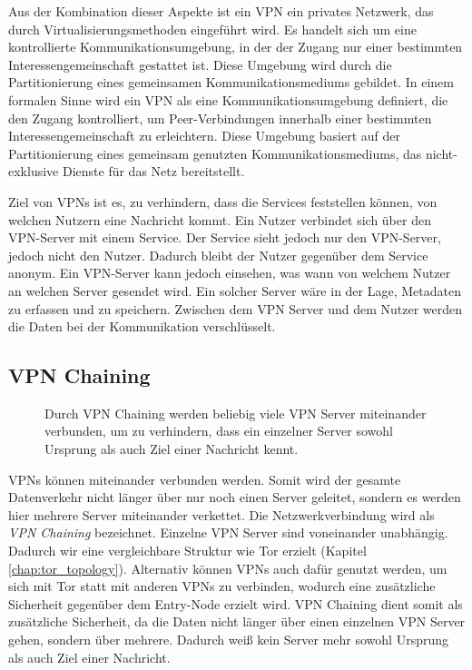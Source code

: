Aus der Kombination dieser Aspekte ist ein VPN ein privates Netzwerk, das durch Virtualisierungsmethoden eingeführt wird. Es handelt sich um eine kontrollierte Kommunikationsumgebung, in der der Zugang nur einer bestimmten Interessengemeinschaft gestattet ist. Diese Umgebung wird durch die Partitionierung eines gemeinsamen Kommunikationsmediums gebildet.
In einem formalen Sinne wird ein VPN als eine Kommunikationsumgebung definiert, die den Zugang kontrolliert, um Peer-Verbindungen innerhalb einer bestimmten Interessengemeinschaft zu erleichtern. Diese Umgebung basiert auf der Partitionierung eines gemeinsam genutzten Kommunikationsmediums, das nicht-exklusive Dienste für das Netz bereitstellt\cite{DefinitionOfVPN}.

Ziel von VPNs ist es, zu verhindern, dass die Services feststellen können, von welchen Nutzern eine Nachricht kommt. Ein Nutzer verbindet sich über den VPN-Server mit einem Service. Der Service sieht jedoch nur den VPN-Server, jedoch nicht den Nutzer. Dadurch bleibt der Nutzer gegenüber dem Service anonym.
Ein VPN-Server kann jedoch einsehen, was wann von welchem Nutzer an welchen Server gesendet wird. Ein solcher Server wäre in der Lage, Metadaten zu erfassen und zu speichern. Zwischen dem VPN Server und dem Nutzer werden die Daten bei der Kommunikation verschlüsselt.

\subsection{VPN Chaining}
\label{chap:vpn_chaining}

\begin{figure}[!h]
    \centering
    
    \caption{Durch VPN Chaining werden beliebig viele VPN Server miteinander verbunden, um zu verhindern, dass ein einzelner Server sowohl Ursprung als auch Ziel einer Nachricht kennt.}
    \label{imgs:vpn_chaining}
\end{figure}

VPNs können miteinander verbunden werden. Somit wird der gesamte Datenverkehr nicht länger über nur noch einen Server geleitet, sondern es werden hier mehrere Server miteinander verkettet. Die Netzwerkverbindung wird als \textit{VPN Chaining} bezeichnet. Einzelne VPN Server sind voneinander unabhängig. Dadurch wir eine vergleichbare Struktur wie Tor erzielt (Kapitel \ref{chap:tor_topology}). Alternativ können VPNs auch dafür genutzt werden, um sich mit Tor statt mit anderen VPNs zu verbinden, wodurch eine zusätzliche Sicherheit gegenüber dem Entry-Node erzielt wird. VPN Chaining dient somit als zusätzliche Sicherheit, da die Daten nicht länger über einen einzelnen VPN Server gehen, sondern über mehrere. Dadurch weiß kein Server mehr sowohl Ursprung als auch Ziel einer Nachricht\cite{VPNChains, SetupOfVPNChaining}.

